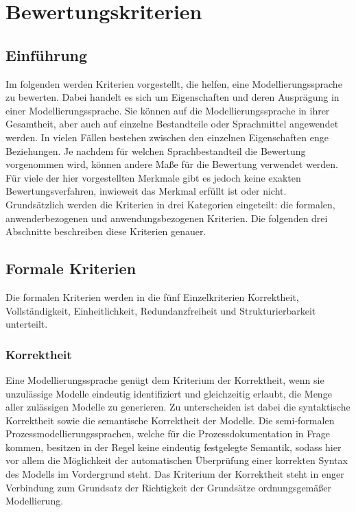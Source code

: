 

\chapter{Bewertungskriterien}

\section{Einführung}
Im folgenden werden Kriterien vorgestellt, die helfen, eine Modellierungssprache zu bewerten. Dabei
handelt es sich um Eigenschaften und deren Ausprägung in einer Modellierungssprache. Sie können
auf die Modellierungssprache in ihrer Gesamtheit, aber auch auf einzelne Bestandteile oder Sprachmittel
angewendet werden. In vielen Fällen bestehen zwischen den einzelnen Eigenschaften enge Beziehungen.
Je nachdem für welchen Sprachbestandteil die Bewertung vorgenommen wird, können andere
Maße für die Bewertung verwendet werden. Für viele der hier vorgestellten Merkmale gibt es jedoch
keine exakten Bewertungsverfahren, inwieweit das Merkmal erfüllt ist oder nicht.\\
Grundsätzlich werden die Kriterien in drei Kategorien eingeteilt: die formalen, anwenderbezogenen und anwendungsbezogenen Kriterien.
Die folgenden drei Abschnitte beschreiben diese Kriterien genauer.


\section{Formale Kriterien}  
Die formalen Kriterien werden in die fünf Einzelkriterien Korrektheit, Vollständigkeit, Einheitlichkeit, Redundanzfreiheit und Strukturierbarkeit unterteilt.
\subsection{Korrektheit}
Eine Modellierungssprache genügt dem Kriterium der Korrektheit, wenn sie unzulässige Modelle eindeutig identifiziert und gleichzeitig erlaubt, die Menge aller zulässigen Modelle zu generieren. Zu unterscheiden ist dabei die syntaktische Korrektheit sowie die semantische Korrektheit der Modelle. Die semi-formalen Prozessmodellierungssprachen, welche für die Prozessdokumentation in Frage kommen, besitzen in der Regel keine eindeutig festgelegte Semantik, sodass hier vor allem die Möglichkeit der automatischen Überprüfung einer korrekten Syntax des Modells im Vordergrund steht. Das Kriterium der Korrektheit steht in enger Verbindung zum Grundsatz der Richtigkeit der Grundsätze ordnungsgemäßer Modellierung.

